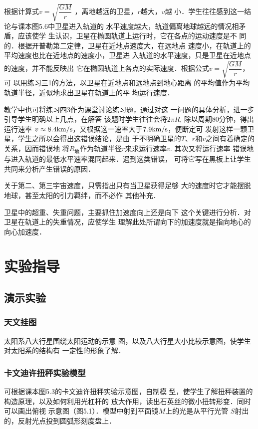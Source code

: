 根据计算式$v=\sqrt{\dfrac{GM}{r}}$
，离地越远的卫星，$r$越大，$v$越
小．学生往往感到这一结论与课本图5.6中卫星进入轨道的
水平速度越大，轨道偏离地球越远的情况相矛盾，应该使学
生认识，卫星在椭圆轨道上运行时，它在各点的运动速度是不
同的．根据开普勒第二定律，卫星在近地点速度大，在远地点
速度小，在轨道上的平均速度也比在近地点的速度小，卫星进
入轨道的水平速度，只是卫星在近地点的速度，并不能反映出
它在椭圆轨道上各点的实际速度．根据公式$v=\sqrt{\dfrac{GM}{r}}$，
可
以用练习三1的方法，以卫星在近地点和远地点到地心距离
的平均值作为平均轨道半径，近似地求出卫星在轨道上的平
均运行速度．

教学中也可将练习四3作为课堂讨论练习题，通过对这
一问题的具体分析，进一步引导学生明确以上几点，在解答
该题时学生往往会将$2\pi R$, 除以周期80分钟，得出运行速率
$v\approx 8.4{\rm km/s}$，又根据这一速率大于$7.9{\rm km/s}$，便断定可
发射这样一颗卫星，学生之所以会得出这错误结论，是由
于不明确卫星的$T$、$r$和$v$之间有着确定的关系，因而错误地
将$R_{\text{地}}$作为轨道半径$r$来求运行速率$v$. 其次又将运行速率
错误地与进入轨道的最低水平速率混同起来．遇到这类错误，
可将它写在黑板上让学生共同来分析产生错误的原因．

关于第二、第三宇宙速度，只需指出只有当卫星获得足够
大的速度时它才能摆脱地球，甚至太阳的引力羁绊，而不必作
其他补充．

卫星中的超重、失重问题，主要抓住加速度向上还是向下
这个关键进行分析．对卫星在轨道上的失重情况，应使学生
理解此处所谓向下的加速度就是指向地心的向心加速度．

\section{实验指导}
\subsection{演示实验}

\subsubsection{天文挂图}

太阳系八大行星围绕太阳运动的示意
图，以及八大行星大小比较示意图，使学生对太阳系的结构有
一定性的形象了解．

\subsubsection{卡文迪许扭秤实验模型}
可根据课本图5.3的卡文迪许扭秤实验示意图，自制模
型，使学生了解扭秤装置的构造原理，以及如何利用光杠杆的
放大作用，读出石英丝的微小扭转形变．同时可以画出俯视
示意图（图5.1）．模型中射到平面镜$M$上的光是从平行光管
$S$射出的，反射光点投到圆弧形刻度盘上．

